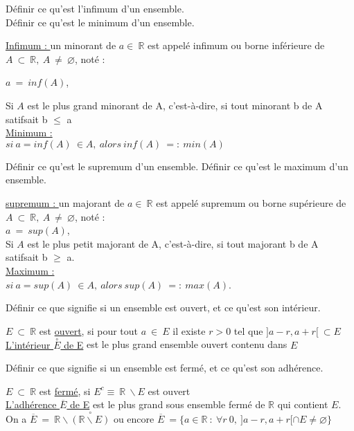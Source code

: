 \documentclass[12pt]{article}
\newcommand*{\xfield}[1]{\begin{mdframed}\centering #1\end{mdframed}\bigskip}
\newenvironment{note}{}{}
\begin{document}
\begin{note}
    \xfield{
        Définir ce qu'est l'infimum d'un ensemble.\\
        Définir ce qu'est le minimum d'un ensemble.\\
    }
    \xfield{
        \underline{Infimum : } un minorant de $a \in\ \mathbb{R}$ est appelé infimum ou borne inférieure de $A\ \subset\ \mathbb{R},\ A\ \neq\ \varnothing$, noté :\\        
        \begin{center}
              $a\ =\ inf(A)$,\\
        \end{center}
        Si $A$ est le plus grand minorant de A, c'est-à-dire, si tout minorant b de A satifsait b $\le$ a\\    
        \underline{Minimum : }\\
        $si\ a=inf(A)\ \in A,\ alors\ inf(A)\ =:\ min(A)$ }
\end{note}

\begin{note}
    \xfield{
        Définir ce qu'est le supremum d'un ensemble.
        Définir ce qu'est le maximum d'un ensemble.
    }
    \xfield{
        \underline{supremum : } un majorant de $a \in\ \mathbb{R}$ est appelé supremum ou borne supérieure de $A\ \subset\ \mathbb{R},\ A\ \neq\ \varnothing$, noté : \\
                $a\ =\ sup(A)$,\\
        Si $A$ est le plus petit majorant de A, c'est-à-dire, si tout majorant b de A satifsait b $\ge$ a.\\        
        \underline{Maximum : }\\
        $si\ a=sup(A)\ \in A,\ alors\ sup(A)\ =:\ max(A)$.
    }
\end{note}

\begin{note}
    \xfield{Définir ce que signifie si un ensemble est ouvert, et ce qu'est son intérieur.}
    \xfield{
        $E\ \subset\ \mathbb{R}$ est \underline{ouvert}, si pour tout $a\ \in\ E$ il existe $r >0$ tel que $] a-r, a+r [\ \subset E$\\
                \underline{L'intérieur $\overset{\circ}{E}$ de E} est le plus grand ensemble ouvert contenu dans $E$
    }
\end{note}

\begin{note}
    \xfield{
        Définir ce que signifie si un ensemble est fermé, et ce qu'est son adhérence.
    }
    \xfield{
        $E\ \subset\ \mathbb{R}$ est \underline{fermé}, si $E^c \equiv\ \mathbb{R}\ \backslash E$ est ouvert\\
        \underline{L'adhérence $\overline{E}$ de E} est le plus grand sous ensemble fermé de $\mathbb{R}$ qui contient $E$. \\
        On a $\overline{E}\ =\ \mathbb{R}\backslash \overset{\circ}{(\mathbb{R}\backslash E)}$ ou encore $\overline{E}\ = \{ a \in \mathbb{R}\ :\ \forall r \> 0,\ ] a-r, a+r[ \cap E \neq \varnothing\} $
    }
\end{note}
\end{document}
